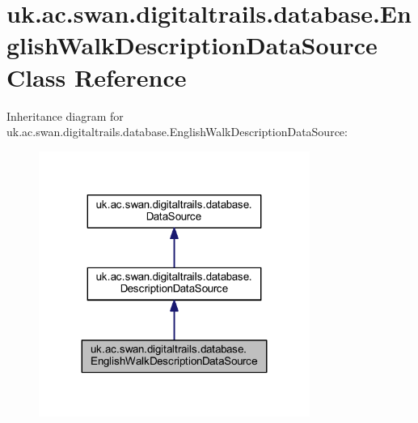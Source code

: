 \hypertarget{classuk_1_1ac_1_1swan_1_1digitaltrails_1_1database_1_1_english_walk_description_data_source}{\section{uk.\+ac.\+swan.\+digitaltrails.\+database.\+English\+Walk\+Description\+Data\+Source Class Reference}
\label{classuk_1_1ac_1_1swan_1_1digitaltrails_1_1database_1_1_english_walk_description_data_source}
}


Inheritance diagram for uk.\+ac.\+swan.\+digitaltrails.\+database.\+English\+Walk\+Description\+Data\+Source\+:\nopagebreak
\begin{figure}[H]
\begin{center}
\leavevmode
\includegraphics[width=251pt]{classuk_1_1ac_1_1swan_1_1digitaltrails_1_1database_1_1_english_walk_description_data_source__inherit__graph}
\end{center}
\end{figure}


